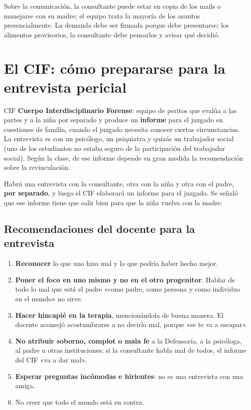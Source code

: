 \documentclass[12pt,oneside]{book}
\begin{document}
Sobre la comunicación, la consultante puede estar en copia de los mails o manejarse con su madre; el equipo trata la mayoría de los asuntos presencialmente. La demanda debe ser firmada porque debe presentarse; los alimentos provisorios, la consultante debe pensarlos y avisar qué decidió.

\section{El CIF: cómo prepararse para la entrevista pericial}

\begin{definition}{CIF}
\textbf{Cuerpo Interdisciplinario Forense}: equipo de peritos que evalúa a las partes y a la niña por separado y produce un \textbf{informe} para el juzgado en cuestiones de familia, cuando el juzgado necesita conocer ciertas circunstancias. La entrevista es con un psicólogo, un psiquiatra y quizás un trabajador social (uno de los estudiantes no estaba seguro de la participación del trabajador social). Según la clase, de ese informe depende en gran medida la recomendación sobre la revinculación.
\end{definition}

Habrá una entrevista con la consultante, otra con la niña y otra con el padre, \textbf{por separado}, y luego el CIF elaborará un informe para el juzgado. Se señaló que ese informe tiene que salir bien para que la niña vuelva con la madre.

\subsection{Recomendaciones del docente para la entrevista}

\begin{enumerate}
    \item \textbf{Reconocer} lo que uno hizo mal y lo que podría haber hecho mejor.
    \item \textbf{Poner el foco en uno mismo y no en el otro progenitor}. Hablar de todo lo mal que está el padre «como padre, como persona y como individuo en el mundo» no sirve.
    \item \textbf{Hacer hincapié en la terapia}, mencionándola de buena manera. El docente aconsejó acostumbrarse a no decirlo mal, porque «se te va a escapar».
    \item \textbf{No atribuir soborno, complot o mala fe} a la Defensoría, a la psicóloga, al padre u otras instituciones: si la consultante habla mal de todos, el informe del CIF «va a dar mal».
    \item \textbf{Esperar preguntas incómodas e hirientes}: no es una entrevista con una amiga.
    \item No creer que todo el mundo está en contra.
\end{enumerate}
\end{document}
